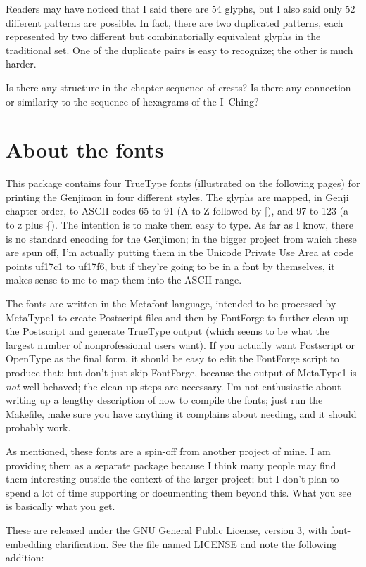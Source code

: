 \documentclass[12pt]{article}
\begin{document}
Readers may have noticed that I said there are 54 glyphs, but I also said
only 52 different patterns are possible.  In fact, there are two duplicated
patterns, each represented by two different but combinatorially equivalent
glyphs in the traditional set.  One of the duplicate pairs is easy to
recognize; the other is much harder.

Is there any structure in the chapter sequence of crests?  Is there any
connection or similarity to the sequence of hexagrams of the I~Ching?

\section{About the fonts}

This package contains four TrueType fonts (illustrated on the following
pages) for printing the Genjimon in four different styles.  The glyphs are
mapped, in Genji chapter order, to ASCII codes 65 to 91 (A to Z followed by
[), and 97 to 123 (a to z plus \{).  The intention is to make them easy to
type.  As far as I know, there is no standard encoding for the Genjimon; in
the bigger project from which these are spun off, I'm actually putting them
in the Unicode Private Use Area at code points uf17c1 to uf17f6, but if
they're going to be in a font by themselves, it makes sense to me to map
them into the ASCII range.

The fonts are written in the Metafont language, intended to be processed by
MetaType1 to create Postscript files and then by FontForge to further clean
up the Postscript and generate TrueType output (which seems to be what the
largest number of nonprofessional users want).  If you actually want
Postscript or OpenType as the final form, it should be easy to edit the
FontForge script to produce that; but don't just skip FontForge, because the
output of MetaType1 is \emph{not} well-behaved; the clean-up steps are
necessary.  I'm not enthusiastic about writing up a lengthy description of
how to compile the fonts; just run the Makefile, make sure you have anything
it complains about needing, and it should probably work.

As mentioned, these fonts are a spin-off from another project of mine.  I am
providing them as a separate package because I think many people may find
them interesting outside the context of the larger project; but I don't plan
to spend a lot of time supporting or documenting them beyond this.  What you
see is basically what you get.

These are released under the GNU General Public License, version 3, with
font-embedding clarification.  See the file named LICENSE and note the
following addition:
\end{document}
